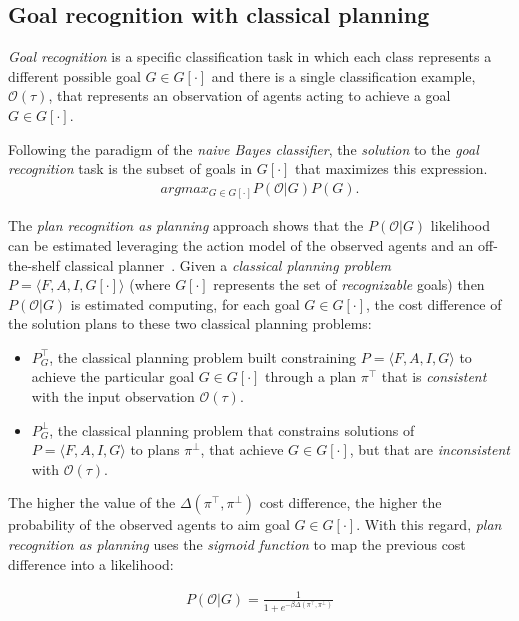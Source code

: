 \documentclass{article}
\newcommand{\tup}[1]{{\langle #1 \rangle}}
\begin{document}
\subsection{Goal recognition with classical planning}
{\em Goal recognition} is a specific classification task in which each class represents a different possible goal $G\in G[\cdot]$ and there is a single classification example, $\mathcal{O}(\tau)$, that represents an observation of agents acting to achieve a goal $G\in G[\cdot]$.

Following the paradigm of the {\em naive Bayes classifier}, the {\em solution} to the {\em goal recognition} task is the subset of goals in $G[\cdot]$ that maximizes this expression.
\begin{align}
argmax_{G\in G[\cdot]} P(\mathcal{O}|G) P(G).
\end{align}

The {\em plan recognition as planning} approach shows that the $P(\mathcal{O}|G)$ likelihood can be estimated leveraging the action model of the observed agents and an off-the-shelf classical planner~\cite{ramirez2012plan}. Given a {\em classical planning problem} $P=\tup{F,A,I,G[\cdot]}$ (where $G[\cdot]$ represents the set of {\em recognizable} goals) then $P(\mathcal{O}|G)$ is estimated computing, for each goal $G\in G[\cdot]$, the cost difference of the solution plans to these two classical planning problems:
\begin{itemize}
\item $P^{\top}_G$, the classical planning problem built constraining $P=\tup{F,A,I,G}$ to achieve the particular goal $G\in G[\cdot]$ through a plan $\pi^\top$ that is {\em consistent} with the input observation $\mathcal{O}(\tau)$.
\item $P^{\bot}_G$, the classical planning problem that constrains solutions of $P=\tup{F,A,I,G}$ to plans $\pi^\bot$, that achieve $G\in G[\cdot]$, but that are {\em inconsistent} with $\mathcal{O}(\tau)$.
\end{itemize}

The higher the value of the $\Delta(\pi^\top,\pi^\bot)$ cost difference, the higher the probability of the observed agents to aim goal $G\in G[\cdot]$. With this regard, {\em plan recognition as planning} uses the {\em sigmoid function} to map the previous cost difference into a likelihood:

\begin{align}
P(\mathcal{O}|G) = \frac{1}{1+e^{-\beta \Delta(\pi^\top,\pi^\bot)}}
\end{align}
\end{document}
